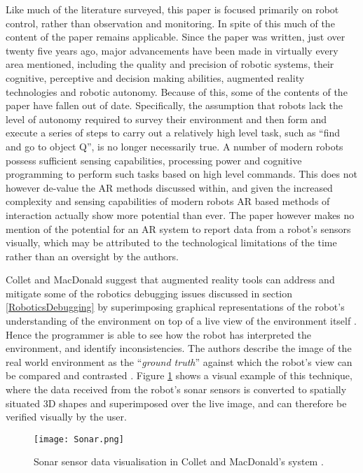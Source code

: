 Like much of the literature surveyed, this paper \cite{Milgram:1993} is focused primarily on robot control, rather than observation and monitoring. In spite of this much of the content of the paper remains applicable. Since the paper was written, just over twenty five years ago, major advancements have been made in virtually every area mentioned, including the quality and precision of robotic systems, their cognitive, perceptive and decision making abilities, augmented reality technologies and robotic autonomy. Because of this, some of the contents of the paper have fallen out of date. Specifically, the assumption that robots lack the level of autonomy required to survey their environment and then form and execute a series of steps to carry out a relatively high level task, such as ``find and go to object Q''\cite{Milgram:1993}, is no longer necessarily true. A number of modern robots possess sufficient sensing capabilities, processing power and cognitive programming to perform such tasks based on high level commands. This does not however de-value the AR methods discussed within, and given the increased complexity and sensing capabilities of modern robots AR based methods of interaction actually show more potential than ever. The paper however makes no mention of the potential for an AR system to report data from a robot's sensors visually, which may be attributed to the technological limitations of the time rather than an oversight by the authors.

Collet and MacDonald \cite{Collet:2006} suggest that augmented reality tools can address and mitigate some of the robotics debugging issues discussed in section \ref{RoboticsDebugging} by superimposing graphical representations of the robot's understanding of the environment on top of a live view of the environment itself \cite{Collet:2006}. Hence the programmer is able to see how the robot has interpreted the environment, and identify inconsistencies. The authors describe the image of the real world environment as the ``\textit{ground truth}'' against which the robot's view can be compared and contrasted \cite{Collet:2006}. Figure \ref{fig:Sonar} shows a visual example of this technique, where the data received from the robot's sonar sensors is converted to spatially situated 3D shapes and superimposed over the live image, and can therefore be verified visually by the user.

\begin{figure}
	\begin{center}
	\texttt{[image: Sonar.png]}
	\decoRule
	\caption{Sonar sensor data visualisation in Collet and MacDonald's system \cite{Collet:2006}.}
	\label{fig:Sonar}
	\end{center}
\end{figure}

